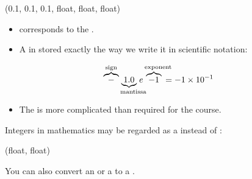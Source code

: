 \documentclass[letterpaper,10pt,english]{sphinxmanual}
\begin{document}
\begin{sphinxVerbatim}[commandchars=\\\{\}]
(\PYGZhy{}0.1, \PYGZhy{}0.1, \PYGZhy{}0.1, float, float, float)
\end{sphinxVerbatim}

\begin{itemize}
\item {} 
 corresponds to the .

\item {} 
A  in stored exactly the way we write it in scientific notation:

\end{itemize}
\begin{equation*}
\begin{split}
\overbrace{-}^{\text{sign}} \underbrace{1.0}_{\text{mantissa}\kern-1em}e\overbrace{-1}^{\text{exponent}\kern-1em}=-1\times 10^{-1}
\end{split}
\end{equation*}\begin{itemize}
\item {} 
The  is more complicated than required for the course.

\end{itemize}

Integers in mathematics may be regarded as a  instead of :

\begin{sphinxVerbatim}[commandchars=\\\{\}]
 
\end{sphinxVerbatim}

\begin{sphinxVerbatim}[commandchars=\\\{\}]
(float, float)
\end{sphinxVerbatim}

You can also convert an  or a  to a .
\end{document}
